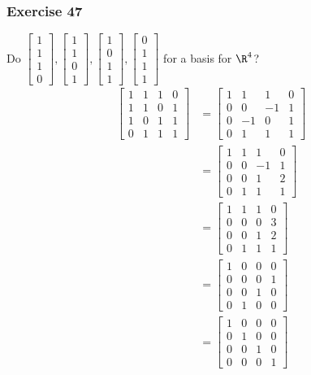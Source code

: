 \documentclass[letterpaper, 12pt]{math}
\begin{document}
\subsubsection*{Exercise 47}
Do \( \begin{bmatrix}1 \\ 1 \\ 1 \\ 0\end{bmatrix},\begin{bmatrix}1 \\ 1 \\ 0 \\
1\end{bmatrix},\begin{bmatrix}1 \\ 0 \\ 1 \\ 1\end{bmatrix},\begin{bmatrix}0 \\
1 \\ 1 \\ 1\end{bmatrix} \) for a basis for \( \R^4 \)?
\begin{align*}
  \begin{bmatrix}
    1 & 1 & 1 & 0 \\
    1 & 1 & 0 & 1 \\
    1 & 0 & 1 & 1 \\
    0 & 1 & 1 & 1
  \end{bmatrix} &= \begin{bmatrix}
    1 & 1 & 1 & 0 \\
    0 & 0 & -1 & 1 \\
    0 & -1 & 0 & 1 \\
    0 & 1 & 1 & 1
  \end{bmatrix} \\
  &= \begin{bmatrix}
    1 & 1 & 1 & 0 \\
    0 & 0 & -1 & 1 \\
    0 & 0 & 1 & 2 \\
    0 & 1 & 1 & 1
  \end{bmatrix} \\
  &= \begin{bmatrix}
    1 & 1 & 1 & 0 \\
    0 & 0 & 0 & 3 \\
    0 & 0 & 1 & 2 \\
    0 & 1 & 1 & 1
  \end{bmatrix} \\
  &= \begin{bmatrix}
    1 & 0 & 0 & 0 \\
    0 & 0 & 0 & 1 \\
    0 & 0 & 1 & 0 \\
    0 & 1 & 0 & 0
  \end{bmatrix} \\
  &= \begin{bmatrix}
    1 & 0 & 0 & 0 \\
    0 & 1 & 0 & 0 \\
    0 & 0 & 1 & 0 \\
    0 & 0 & 0 & 1
  \end{bmatrix}
\end{align*}
\end{document}
